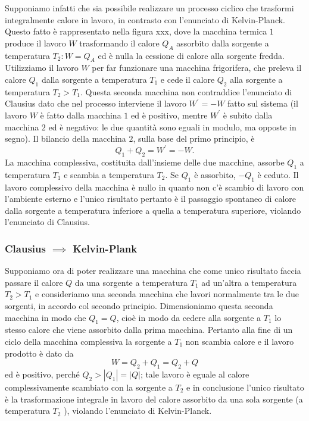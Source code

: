 \documentclass[class=book, crop=false, oneside, 12pt]{standalone}
\begin{document}
Supponiamo infatti che sia possibile realizzare un processo ciclico che trasformi integralmente calore in lavoro, in contrasto con l'enunciato di Kelvin-Planck. 
Questo fatto è rappresentato nella figura xxx, dove la macchina termica \(1\) produce il lavoro \(W\) trasformando il calore \(Q_A\) assorbito dalla sorgente a temperatura \(T_2 : W = Q_A\) ed è nulla la cessione di calore alla sorgente fredda. 
Utilizziamo il lavoro \(W\) per far funzionare una macchina frigorifera, che preleva il calore \(Q_1\) dalla sorgente a temperatura \(T_1\) e cede il calore \(Q_2\) alla sorgente a temperatura \(T_2>T_1\). 
Questa seconda macchina non contraddice l'enunciato di Clausius dato che nel processo interviene il lavoro \(W^{\prime} = -W\) fatto sul sistema (il lavoro \(W\) è fatto dalla macchina \(1\) ed è positivo, mentre \(W^{\prime}\) è subito dalla macchina \(2\) ed è negativo: 
le due quantità sono eguali in modulo, ma opposte in segno). 
Il bilancio della macchina \(2\), sulla base del primo principio, è 
\begin{equation*}
    Q_1 + Q_2 = W^{\prime} = - W.
\end{equation*}
La macchina complessiva, costituita dall'insieme delle due macchine, assorbe \(Q_1\) a temperatura \(T_1\) e scambia a temperatura \(T_2\). 
Se \(Q_1\) è assorbito, \(-Q_1\) è ceduto. 
Il lavoro complessivo della macchina è nullo in quanto non c'è scambio di lavoro con l'ambiente esterno e l'unico risultato pertanto è il passaggio spontaneo di calore dalla sorgente a temperatura inferiore a quella a temperatura superiore, violando l'enunciato di Clausius.

\subsubsection*{Clausius \(\implies\) Kelvin-Plank}

Supponiamo ora di poter realizzare una macchina che come unico risultato faccia passare il calore \(Q\) da una sorgente a temperatura \(T_1\) ad un'altra a temperatura \(T_2 > T_1\) e consideriamo una seconda macchina che lavori normalmente tra le due sorgenti, in accordo col secondo principio. 
Dimensioniamo questa seconda macchina in modo che \( Q_1 = Q\), cioè in modo da cedere alla sorgente a \(T_1\) lo stesso calore che viene assorbito dalla prima macchina.
Pertanto alla fine di un ciclo della macchina complessiva la sorgente a \(T_1\) non scambia calore e il lavoro prodotto è dato da 
\begin{equation*}
    W = Q_2 + Q_1 = Q_2 + Q
\end{equation*}
ed è positivo, perché \(Q_2 > |Q_1| = |Q| \); tale lavoro è eguale al calore complessivamente scambiato con la sorgente a \(T_2\) e in conclusione l'unico risultato è la trasformazione integrale in lavoro del calore assorbito da una sola sorgente (a temperatura \(T_2\) ), violando l'enunciato di Kelvin-Planck.
\end{document}
